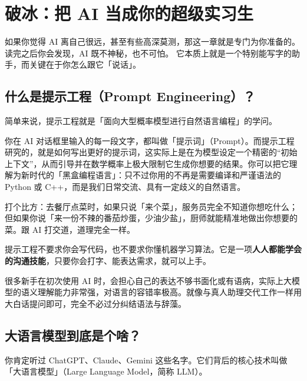 % 
% 


\chapter{破冰：把 AI 当成你的超级实习生}
\label{ch:icebreaker}

如果你觉得 AI 离自己很远，甚至有些高深莫测，那这一章就是专门为你准备的。
读完之后你会发现，AI 既不神秘，也不可怕。
它本质上就是一个特别能写字的助手，而关键在于你怎么跟它「说话」。

\section{什么是提示工程（Prompt Engineering）？}

简单来说，提示工程就是「面向大型概率模型进行自然语言编程」的学问。

你在 AI 对话框里输入的每一段文字，都叫做「提示词」（Prompt）。而提示工程研究的，就是如何写出更好的提示词，这实际上是在为模型设定一个精密的“初始上下文”，从而引导并在数学概率上极大限制它生成你想要的结果。你可以把它理解为新时代的「黑盒编程语言」：只不过你用的不再是需要编译和严谨语法的 Python 或 C++，而是我们日常交流、具有一定歧义的自然语言。

打个比方：去餐厅点菜时，如果只说「来个菜」，服务员完全不知道你想吃什么；但如果你说「来一份不辣的番茄炒蛋，少油少盐」，厨师就能精准地做出你想要的菜。跟 AI 打交道，道理完全一样。

提示工程不要求你会写代码，也不要求你懂机器学习算法。它是一项\textbf{人人都能学会的沟通技能}，只要你会打字、能表达需求，就可以上手。

\begin{tipbox}
很多新手在初次使用 AI 时，会担心自己的表达不够书面化或有语病，实际上大模型的语义理解能力非常强，对语言的容错率极高。就像与真人助理交代工作一样用大白话提问即可，完全不必过分纠结语法与辞藻。
\end{tipbox}

\section{大语言模型到底是个啥？}

你肯定听过 ChatGPT、Claude、Gemini 这些名字。它们背后的核心技术叫做「大语言模型」（Large Language Model，简称 LLM）。

